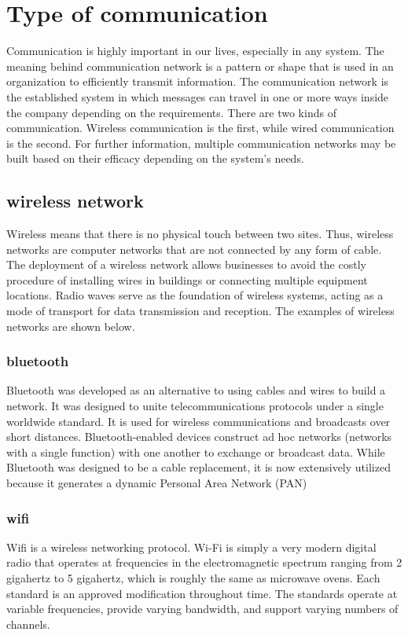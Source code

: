 \section{Type of communication}
Communication is highly important in our lives, especially in any system. The meaning behind communication network is a pattern or shape that is used in an organization to efficiently transmit information. The communication network is the established system in which messages can travel in one or more ways inside the company depending on the requirements. There are two kinds of communication. Wireless communication is the first, while wired communication is the second. For further information, multiple communication networks may be built based on their efficacy depending on the system's needs. 

\subsection{wireless network}
Wireless means that there is no physical touch between two sites. Thus, wireless networks are computer networks that are not connected by any form of cable. The deployment of a wireless network allows businesses to avoid the costly procedure of installing wires in buildings or connecting multiple equipment locations. Radio waves serve as the foundation of wireless systems, acting as a mode of transport for data transmission and reception. The examples of wireless networks are shown below.
\subsubsection{bluetooth}
Bluetooth was developed as an alternative to using cables and wires to build a network. It was designed to unite telecommunications protocols under a single worldwide standard. It is used for wireless communications and broadcasts over short distances. Bluetooth-enabled devices construct ad hoc networks (networks with a single function) with one another to exchange or broadcast data. While Bluetooth was designed to be a cable replacement, it is now extensively utilized because it generates a dynamic Personal Area Network (PAN) \cite{b2}

\subsubsection{wifi}
Wifi is a wireless networking protocol. Wi-Fi is simply a very modern digital radio that operates at frequencies in the electromagnetic spectrum ranging from 2 gigahertz to 5 gigahertz, which is roughly the same as microwave ovens. Each standard is an approved modification throughout time. The standards operate at variable frequencies, provide varying bandwidth, and support varying numbers of channels.\cite{b3}

